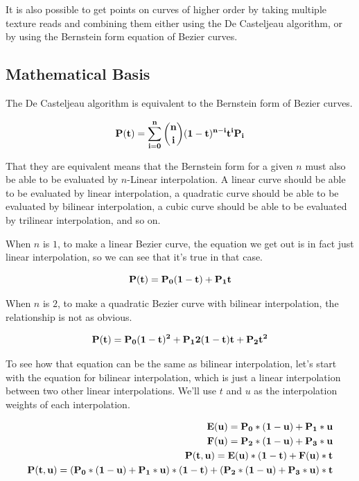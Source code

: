 \documentclass{jcgt}
\begin{document}
It is also possible to get points on curves of higher order by taking multiple texture reads and combining them either using the De Casteljeau algorithm, or by using the Bernstein form equation of Bezier curves.

\subsection{Mathematical Basis}

The De Casteljeau algorithm is equivalent to the Bernstein form of Bezier curves.

\begin{equation}
\bf{P(t)} = \sum\limits_{i=0}^n\binom {n} {i}(1-t)^{n-i}t^i\text{\bf{P}}_i
\label{eqn:bernsteinform}
\end{equation}

That they are equivalent means that the Bernstein form for a given $n$ must also be able to be evaluated by $n$-Linear interpolation.  A linear curve should be able to be evaluated by linear interpolation, a quadratic curve should be able to be evaluated by bilinear interpolation, a cubic curve should be able to be evaluated by trilinear interpolation, and so on.

When $n$ is $1$, to make a linear Bezier curve, the equation we get out is in fact just linear interpolation, so we can see that it's true in that case.

\begin{equation}
\bf{P(t)} = P_0(1-t) + P_1t
\label{eqn:bernsteinformn1}
\end{equation}

When $n$ is $2$, to make a quadratic Bezier curve with bilinear interpolation, the relationship is not as obvious.

\begin{equation}
\bf{P(t)} = P_0(1-t)^2 + P_12(1-t)t + P_2t^2
\label{eqn:bernsteinformn2}
\end{equation}

To see how that equation can be the same as bilinear interpolation, let's start with the equation for bilinear interpolation, which is just a linear interpolation between two other linear interpolations.  We'll use $t$ and $u$ as the interpolation weights of each interpolation.

\begin{equation}
\begin{split}
\bf{E(u)} = P_0*(1-u) + P_1*u \\
\bf{F(u)} = P_2*(1-u) + P_3*u \\
\bf{P(t,u)} = E(u)*(1-t) + F(u)*t \\
\bf{P(t,u)} = (P_0*(1-u) + P_1*u)*(1-t) + (P_2*(1-u) + P_3*u)*t
\end{split}
\label{eqn:bilinearinterpolation}
\end{equation}
\end{document}
